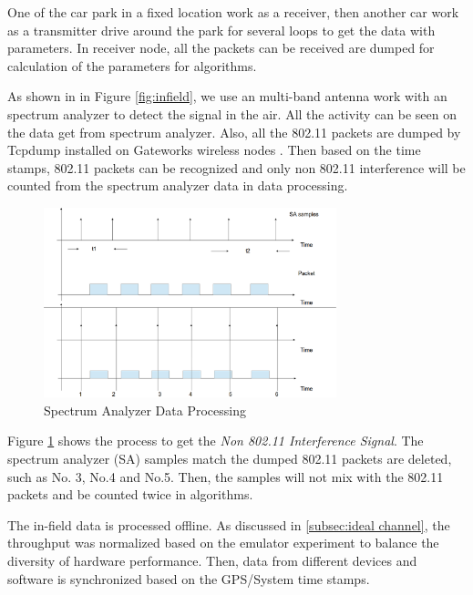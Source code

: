 One of the car park in a fixed location work as a receiver, then another car work as a transmitter drive around the park for several loops to get the data with parameters. 
In receiver node, all the packets can be received are dumped for calculation of the parameters for algorithms. 

As shown in in Figure \ref{fig:infield}, we use an multi-band antenna work with an spectrum analyzer to detect the signal in the air. All the activity can be seen on the data get from spectrum analyzer.
Also, all the 802.11 packets are dumped by Tcpdump installed on Gateworks wireless nodes \cite{jacobson1989tcpdump}. Then based on the time stamps, 802.11 packets can be recognized and only non 802.11 interference will be counted from the spectrum analyzer data in data processing.  

\begin{figure}
\centering
\includegraphics[width=85mm]{figure/sa_process}
\caption{Spectrum Analyzer Data Processing}
\label{fig:sa_process}
\end{figure}

Figure \ref{fig:sa_process} shows the process to get the \emph{Non 802.11 Interference Signal}. The spectrum analyzer (SA) samples match the dumped 802.11 packets are deleted, such as No. 3, No.4 and No.5. Then, the samples will not mix with the 802.11 packets and be counted twice in algorithms.


The in-field data is processed offline. As discussed in \ref{subsec:ideal channel}, the throughput was normalized based on the emulator experiment to balance the diversity of hardware performance. Then, data from different devices and software is synchronized based on the GPS/System time stamps.



